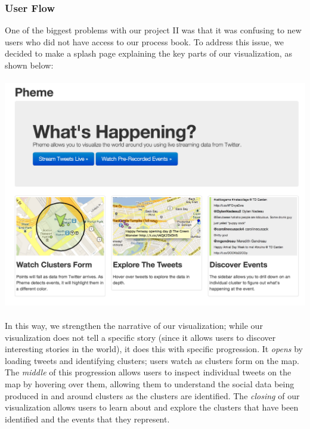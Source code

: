 \documentclass[pdftex,12pt,a4paper]{article}
\begin{document}
\subsubsection{User Flow}
One of the biggest problems with our project II was that it was confusing to new users who did not have access to our process book. To address this issue, we decided to make a splash page explaining the key parts of our visualization, as shown below: \\ \\
\includegraphics[width=5.5in]{splash.png} \\ \\
In this way, we strengthen the narrative of our visualization; while our visualization does not tell a specific story (since it allows users to discover interesting stories in the world), it does this with specific progression. It \emph{opens} by loading tweets and identifying clusters; users watch as clusters form on the map. The \emph{middle} of this progression allows users to inspect individual tweets on the map by hovering over them, allowing them to understand the social data being produced in and around clusters as the clusters are identified. The \emph{closing} of our visualization allows users to learn about and explore the clusters that have been identified and the events that they represent.
\end{document}
